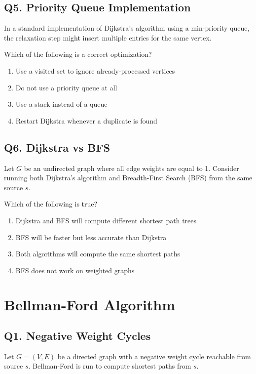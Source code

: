 \subsection*{Q5. Priority Queue Implementation}
In a standard implementation of Dijkstra’s algorithm using a min-priority queue, the relaxation step might insert multiple entries for the same vertex.

Which of the following is a correct optimization?

\begin{enumerate}[label=(\alph*)]
    \item Use a visited set to ignore already-processed vertices
    \item Do not use a priority queue at all
    \item Use a stack instead of a queue
    \item Restart Dijkstra whenever a duplicate is found
\end{enumerate}

\subsection*{Q6. Dijkstra vs BFS}
Let $G$ be an undirected graph where all edge weights are equal to 1. Consider running both Dijkstra’s algorithm and Breadth-First Search (BFS) from the same source $s$.

Which of the following is true?

\begin{enumerate}[label=(\alph*)]
    \item Dijkstra and BFS will compute different shortest path trees
    \item BFS will be faster but less accurate than Dijkstra
    \item Both algorithms will compute the same shortest paths
    \item BFS does not work on weighted graphs
\end{enumerate}

\newpage
\section{Bellman-Ford Algorithm}
\subsection*{Q1. Negative Weight Cycles}
Let $G = (V, E)$ be a directed graph with a negative weight cycle reachable from source $s$. Bellman-Ford is run to compute shortest paths from $s$.

